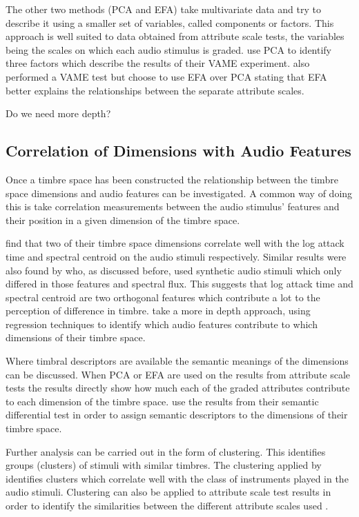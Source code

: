 		The other two methods (PCA and EFA) take multivariate data and try to describe it using a smaller set of
		variables, called components or factors. This approach is well suited to data obtained from attribute scale
		tests, the variables being the scales on which each audio stimulus is graded. \citet{kendall1993verbal1}
		use PCA to identify three factors which describe the results of their VAME experiment.
		\citet{zacharakis2012analysis} also performed a VAME test but choose to use EFA over PCA stating that EFA
		better explains the relationships between the separate attribute scales.

		\note
		{
			Do we need more depth?
		}

	\subsection{Correlation of Dimensions with Audio Features}
	\label{sec:Timbre-DimensionalityReduction-DimensionCorrelations}
		Once a timbre space has been constructed the relationship between the timbre space dimensions and audio
		features can be investigated. A common way of doing this is take correlation measurements between the audio
		stimulus' features and their position in a given dimension of the timbre space.

		\citet{mcadams1995perceptual} find that two of their timbre space dimensions correlate well with the log
		attack time and spectral centroid on the audio stimuli respectively. Similar results were also found by
		\citet{caclin2005acoustic} who, as discussed before, used synthetic audio stimuli which only differed in
		those features and spectral flux. This suggests that log attack time and spectral centroid are two
		orthogonal features which contribute a lot to the perception of difference in timbre.
		\citet{alluri2010exploring} take a more in depth approach, using regression techniques to identify which
		audio features contribute to which dimensions of their timbre space.

		Where timbral descriptors are available the semantic meanings of the dimensions can be discussed. When PCA
		or EFA are used on the results from attribute scale tests the results directly show how much each of the
		graded attributes contribute to each dimension of the timbre space. \citet{marui2005timbre} use the results
		from their semantic differential test in order to assign semantic descriptors to the dimensions of their
		timbre space.

		Further analysis can be carried out in the form of clustering. This identifies groups (clusters) of stimuli
		with similar timbres. The clustering applied by \citet{lakatos2000a} identifies clusters which correlate
		well with the class of instruments played in the audio stimuli. Clustering can also be applied to attribute
		scale test results in order to identify the similarities between the different attribute scales used
		\citep{zacharakis2011an2}.

